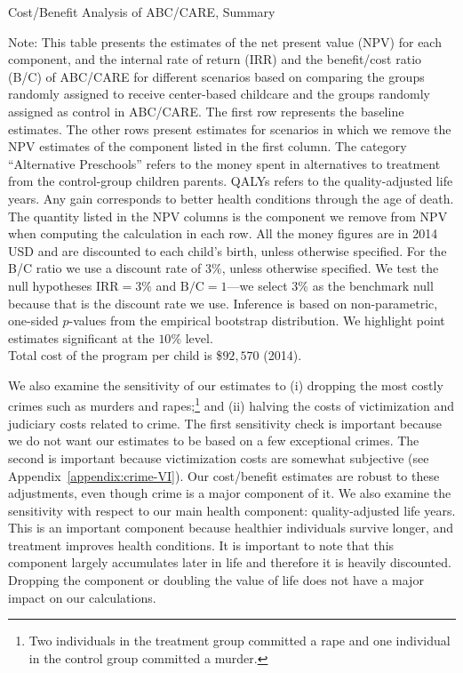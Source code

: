 \begin{table}[H]
\centering
\caption{Cost/Benefit Analysis of ABC/CARE, Summary}\label{table:cba}
\begin{threeparttable}
\tiny

\begin{tablenotes}
\footnotesize
\item Note: This table presents the estimates of the net present value (NPV) for each component, and the internal rate of return (IRR) and the benefit/cost ratio (B/C) of ABC/CARE for different scenarios based on comparing the groups randomly assigned to receive center-based childcare and the groups randomly assigned as control in ABC/CARE. The first row represents the baseline estimates. The other rows present estimates for scenarios in which we remove the NPV estimates of the component listed in the first column. The category ``Alternative Preschools'' refers to the money spent in alternatives to treatment from the control-group children parents. QALYs refers to the quality-adjusted life years. Any gain corresponds to better health conditions through the age of death. The quantity listed in the NPV columns is the component we remove from NPV when computing the calculation in each row. All the money figures are in 2014 USD and are discounted to each child's birth, unless otherwise specified. For the B/C ratio we use a discount rate of $3\%$, unless otherwise specified. We test the null hypotheses $\text{IRR} = 3\%$ and $\text{B/C} = 1$---we select $3\%$ as the benchmark null because that is the discount rate we use. Inference is based on non-parametric, one-sided $p$-values from the empirical bootstrap distribution. We highlight point estimates significant at the $10\%$ level.\\
    Total cost of the program per child is \$$92,570$ (2014).
\end{tablenotes}
\end{threeparttable}
\end{table}

We also examine the sensitivity of our estimates to (i) dropping the most costly crimes such as murders and rapes;\footnote{Two individuals in the treatment group committed a rape and one individual in the control group committed a murder.} and (ii) halving the costs of victimization and judiciary costs related to crime. The first sensitivity check is important because we do not want our estimates to be based on a few exceptional crimes. The second is important because victimization costs are somewhat subjective (see  Appendix~\ref{appendix:crime-VI}). Our cost/benefit estimates are robust to these adjustments, even though crime is a major component of it. We also examine the sensitivity with respect to our main health component: quality-adjusted life years. This is an important component because healthier individuals survive longer, and treatment improves health conditions. It is important to note that this component largely accumulates later in life and therefore it is heavily discounted. Dropping the component or doubling the value of life does not have a major impact on our calculations.

